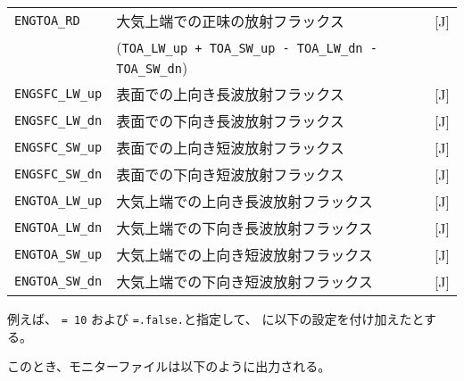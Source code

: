 \begin{table}[h]
\begin{center}
\begin{tabularx}{150mm}{|l|X|l|}
      \verb|ENGTOA_RD|    & 大気上端での正味の放射フラックス      & [J] \\
                          & (\verb|TOA_LW_up + TOA_SW_up - TOA_LW_dn - TOA_SW_dn|) & \\
      \verb|ENGSFC_LW_up| & 表面での上向き長波放射フラックス           & [J] \\
      \verb|ENGSFC_LW_dn| & 表面での下向き長波放射フラックス           & [J] \\
      \verb|ENGSFC_SW_up| & 表面での上向き短波放射フラックス           & [J] \\
      \verb|ENGSFC_SW_dn| & 表面での下向き短波放射フラックス           & [J] \\
      \verb|ENGTOA_LW_up| & 大気上端での上向き長波放射フラックス & [J] \\
      \verb|ENGTOA_LW_dn| & 大気上端での下向き長波放射フラックス & [J] \\
      \verb|ENGTOA_SW_up| & 大気上端での上向き短波放射フラックス & [J] \\
      \verb|ENGTOA_SW_dn| & 大気上端での下向き短波放射フラックス & [J] \\
    \hline
  \end{tabularx}
\end{center}
\end{table}

例えば、  \verb|= 10| および \verb|=.false.|と指定して、
に以下の設定を付け加えたとする。

\noindent
このとき、モニターファイルは以下のように出力される。

